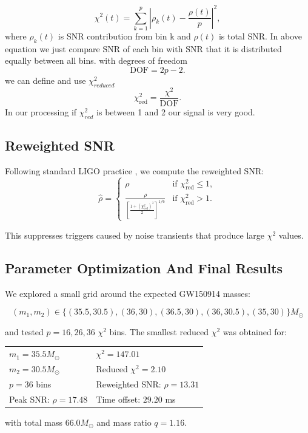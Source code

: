 \begin{equation}
	\chi^2(t) = \sum_{k=1}^{p} {\left| \rho_k(t) - \frac{\rho(t)}{p} \right|^2} ,
\end{equation}
where $\rho_k(t)$ is SNR contribution from bin k and $\rho(t)$ is total SNR. In above equation we just compare SNR of each bin with SNR that it is distributed equally between all bins. 
with degrees of freedom
\begin{equation}
	\mathrm{DOF} = 2p - 2 .
\end{equation}
we can define and use $\chi^2_{reduced}$
\begin{equation}
	\chi^2_{\mathrm{red}} = \frac{\chi^2}{\mathrm{DOF}} .
\end{equation}
In our processing if $\chi^2_{red}$ is between 1 and 2 our signal is very good.

\subsection{Reweighted SNR}

Following standard LIGO practice \cite{Allen2005Chisq, Abbott2016Discovery},
we compute the reweighted SNR:
\begin{equation}
	\hat{\rho} =
	\begin{cases}
		\rho & \text{if } \chi^2_{\mathrm{red}} \le 1, \\
		\displaystyle
		\frac{\rho}{\left[\frac{1 + (\chi^2_{\mathrm{red}})^3}{2}\right]^{1/6}}
		& \text{if } \chi^2_{\mathrm{red}} > 1.
	\end{cases}
\end{equation}

This suppresses triggers caused by noise transients that
produce large $\chi^2$ values.

\subsection{Parameter Optimization And Final Results}

We explored a small grid around the expected GW150914 masses:

\[
(m_1, m_2) \in
\{(35.5,30.5), (36,30), (36.5,30), (36,30.5), (35,30)\} M_\odot
\]

and tested $p = 16, 26, 36$ $\chi^2$ bins. The smallest reduced $\chi^2$ was obtained for:

\begin{table}[h]
	\centering
	\begin{tabular}{ll}
		$m_1 = 35.5 M_\odot$          & $\chi^2 = 147.01$ \\
		$m_2 = 30.5 M_\odot$          & Reduced $\chi^2 = 2.10$ \\
		$p = 36$ bins                 & Reweighted SNR: $\hat{\rho} = 13.31$ \\
		Peak SNR: $\rho = 17.48$      & Time offset: $29.20$ ms \\
	\end{tabular}
\end{table}
with total mass $66.0 M_\odot$ and mass ratio $q = 1.16$.


